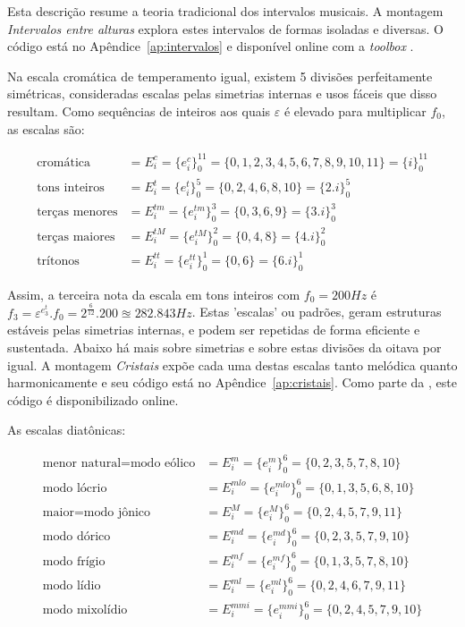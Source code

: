 Esta descrição resume a teoria tradicional dos intervalos musicais.\cite{Lacerda} A montagem \emph{Intervalos entre alturas} explora estes intervalos de formas isoladas e diversas. O código está no Apêndice~\ref{ap:intervalos} e disponível online com a \emph{toolbox} \massa.\cite{massa}


Na escala cromática
de temperamento igual, existem 5 divisões perfeitamente simétricas, consideradas
escalas pelas simetrias internas e usos fáceis que disso resultam. Como sequências de inteiros aos quais $\varepsilon$ é elevado
para multiplicar $f_0$, as escalas são:

\begin{equation}\label{escSim}
\begin{split}
\text{cromática} & = E_i^c = \{e_i^c\}_0^{11} =  \{0,1,2,3,4,5,6,7,8,9,10,11\} = \{i\}_0^{11}\\
\text{tons inteiros} & = E_i^t = \{e_i^t\}_0^{5} = \{0,2,4,6,8,10\} = \{2.i\}_0^{5} \\
\text{terças menores} & = E_i^{tm} = \{e_i^{tm}\}_0^{3} = \{0,3,6,9\} = \{3.i\}_0^3 \\
\text{terças maiores} & = E_i^{tM} = \{e_i^{tM}\}_0^{2} = \{0,4,8\} = \{4.i\}_0^2\\
\text{trítonos} & = E_i^{tt} = \{e_i^{tt}\}_0^{1} = \{ 0, 6 \} = \{6.i\}_0^1
\end{split}
\end{equation}

Assim, a terceira nota da escala em tons inteiros com $f_0=200Hz$
é $f_3=\varepsilon^{e_3^t} . f_0 = 2^{\frac{6}{12}} . 200 \approxeq 282.843 Hz$. Estas
'escalas' ou padrões, geram estruturas estáveis pelas simetrias internas, e podem ser
repetidas de forma eficiente e sustentada. Abaixo há mais sobre simetrias e
sobre estas divisões da oitava por igual. A montagem \emph{Cristais} expõe cada uma destas escalas tanto melódica quanto harmonicamente e seu código está no Apêndice~\ref{ap:cristais}. Como parte da \massa, este código é disponibilizado online.

As escalas diatônicas:

\begin{equation}\label{eq:escalas}
\begin{split}
\text{menor natural} = \text{modo eólico} & = E_i^m = \{e_i^m\}_0^6 = \{0,2,3,5,7,8,10\} \\
\text{modo lócrio} & = E_i^{mlo} = \{e_i^{mlo}\}_0^6 = \{0,1,3,5,6,8,10\} \\ 
\text{maior}  = \text{modo jônico} & = E_i^M = \{e_i^M\}_0^6 = \{0,2,4,5,7,9,11\} \\
\text{modo dórico} & = E_i^{md} = \{e_i^{md}\}_0^6 = \{0,2,3,5,7,9,10\} \\
\text{modo frígio} & = E_i^{mf} = \{e_i^{mf}\}_0^6 = \{0,1,3,5,7,8,10\} \\
\text{modo lídio} & = E_i^{ml}=\{e_i^{ml}\}_0^6 = \{0,2,4,6,7,9,11\} \\
\text{modo mixolídio} & = E_i^{mmi} = \{e_i^{mmi}\}_0^6 = \{0,2,4,5,7,9,10\}
\end{split}
\end{equation}

